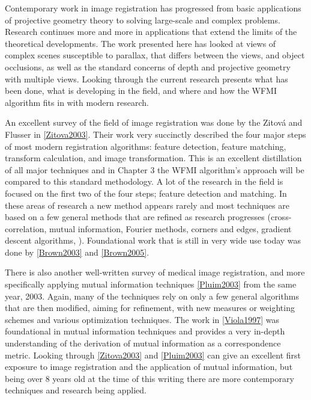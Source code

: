 %
%
%
%
%
%

%
%
%



Contemporary work in image registration has progressed from basic applications of projective geometry theory to solving large-scale and complex problems. Research continues more and more in applications that extend the limits of the theoretical developments. The work presented here has looked at views of complex scenes susceptible to parallax, that differs between the views, and object occlusions, as well as the standard concerns of depth and projective geometry with multiple views. Looking through the current research presents what has been done, what is developing in the field, and where and how the WFMI algorithm fits in with modern research.

 An excellent survey of the field of image registration was done by the Zitov{\'a} and Flusser in \ref{Zitova2003}. Their work very succinctly described the four major steps of most modern registration algorithms: feature detection, feature matching, transform calculation, and image transformation. This is an excellent distillation of all major techniques and in Chapter 3 the WFMI algorithm's approach will be compared to this standard methodology. A lot of the research in the field is focused on the first two of the four steps; feature detection and matching. In these areas of research a new method appears rarely and most techniques are based on a few general methods that are refined as research progresses (cross-correlation, mutual information, Fourier methods, corners and edges, gradient descent algorithms, \etc). Foundational work that is still in very wide use today was done by \ref{Brown2003} and \ref{Brown2005}.
 
 There is also another well-written survey of medical image registration, and more specifically applying mutual information techniques \ref{Pluim2003} from the same year, 2003. Again, many of the techniques rely on only a few general algorithms that are then modified, aiming for refinement, with new measures or weighting schemes and various optimization techniques. The work in \ref{Viola1997} was foundational in mutual information techniques and provides a very in-depth understanding of the derivation of mutual information as a correspondence metric. Looking through \ref{Zitova2003} and \ref{Pluim2003} can give an excellent first exposure to image registration and the application of mutual information, but being over 8 years old at the time of this writing there are more contemporary techniques and research being applied.
 
